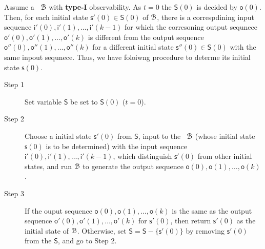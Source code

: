 Assume a \BCN\ ${\mathcal{B}}$  with {\bf type-I}  observability. As $t=0$ the $\mathsf{S}(0)$ is decided by $\mathsf{o}(0)$. Then, for  each initial state $\mathsf{s}'(0)\in \mathsf{S}(0)$ of ${\mathcal{B}}$, there is a correspdining input sequence $\mathsf{i}'(0),\mathsf{i}'(1),\ldots, \mathsf{i}'(k-1)$ for which the corresoning output sequnece $\mathsf{o}'(0),\mathsf{o}'(1),\ldots,\mathsf{o}'(k)$ is different from the output sequence $\mathsf{o}''(0),\mathsf{o}''(1),\ldots,\mathsf{o}''(k)$ for a different initial state $\mathsf{s}''(0)\in \mathsf{S}(0)$ with the same inpout sequnece. Thus, we have foloiwng procedure to determe its initial state $\mathsf{s}(0)$.
\begin{description}
	\item[Step 1] Set variable $\mathsf{S}$ be set to $\mathsf{S}(0)$ ($t=0$).
	\item[Step 2] Choose a initial state $\mathsf{s}'(0)$ from $\mathsf{S}$, input to the \BCN\ ${\mathcal{B}}$ (whose initial state $\mathsf{s}(0)$ is to be determined) with the input sequence $\mathsf{i}'(0),\mathsf{i}'(1),\ldots, \mathsf{i}'(k-1)$, which distinguish $\mathsf{s}'(0)$ from other initial states, and run ${\mathcal{B}}$ to generate the output sequence $\mathsf{o}(0),\mathsf{o}(1),\ldots,\mathsf{o}(k)$.
	\item[Step 3] If the ouput sequence $\mathsf{o}(0),\mathsf{o}(1),\ldots,\mathsf{o}(k)$ is the same as the output sequence $\mathsf{o}'(0),\mathsf{o}'(1),\ldots,\mathsf{o}'(k)$ for $\mathsf{s}'(0)$, then return $\mathsf{s}'(0)$ as the initial state of ${\mathcal{B}}$. Otherwise, set $\mathsf{S}=\mathsf{S}-\{\mathsf{s}'(0)\}$ by removing $\mathsf{s}'(0)$ from the $\mathsf{S}$, and go to Step 2.
	
\end{description}

